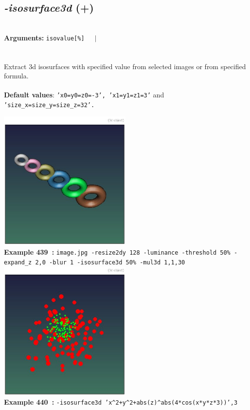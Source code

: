 \documentclass[a4paper,11pt,twoside]{book}
\begin{document}
\subsection{\emph{-isosurface3d} (+)}\vspace*{-0.5em}
~\\\textbf{Arguments: } 
{\small \texttt{isovalue[\%]}}~~~$|$\\
\\~\\
Extract 3d isosurfaces with specified value from selected images or from specified formula.
~\\~\\\textbf{Default values}: {\small \texttt{'x0=y0=z0=-3', 'x1=y1=z1=3'} and \texttt{'size\_x=size\_y=size\_z=32'.}}
\begin{center}\includegraphics[keepaspectratio=true,height=7cm,width=\textwidth]{img/gmic_def439.jpg}\\
{\footnotesize \textbf{Example 439~:} \texttt{image.jpg -resize2dy 128 -luminance -threshold 50\% -expand\_z 2,0 -blur 1 -isosurface3d 50\% -mul3d 1,1,30}}
\\\includegraphics[keepaspectratio=true,height=7cm,width=\textwidth]{img/gmic_def440.jpg}\\
{\footnotesize \textbf{Example 440~:} \texttt{-isosurface3d 'x\textasciicircum 2+y\textasciicircum 2+abs(z)\textasciicircum abs(4*cos(x*y*z*3))',3}}
\end{center}
\end{document}
